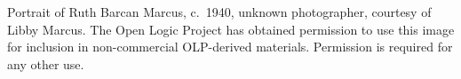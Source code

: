 Portrait of Ruth Barcan Marcus, c.~1940, unknown photographer, courtesy of
Libby Marcus. The Open Logic Project has obtained permission to use
this image for inclusion in non-commercial OLP-derived materials.
Permission is required for any other use.
